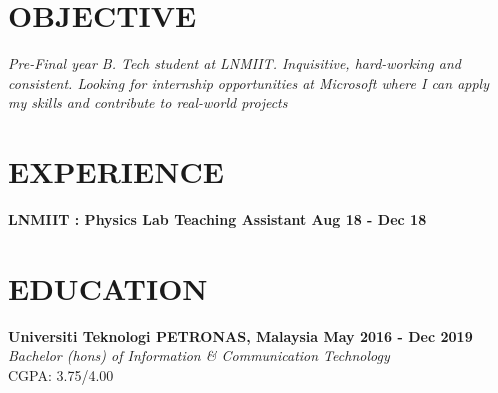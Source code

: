 \documentclass[margin]{res}
\begin{document}
\address{
\\\url{Github : https://www.github.com/louiszhenyean}
\\\url{Hackthebox : https://www.hackthebox.eu/profile/223593}
\\}
\address{
\\louiszhenyean@gmail.com
\\(+60) 19-567 5808
\\ \\}
\begin{resume}
\section{OBJECTIVE}
{\sl Pre-Final year B. Tech student at LNMIIT. Inquisitive, hard-working and consistent. Looking for internship opportunities at Microsoft where I can apply my skills and contribute to real-world projects }
\section{EXPERIENCE}
\textbf{LNMIIT : Physics Lab Teaching Assistant \hfill{Aug 18 - Dec 18}\\}
\section{EDUCATION}
\textbf{Universiti Teknologi PETRONAS, Malaysia
\hfill{May 2016 - Dec 2019}} \\
{\sl Bachelor (hons) of Information \& Communication Technology} \\
\hfill CGPA: 3.75/4.00


\end{resume}
\end{document}
